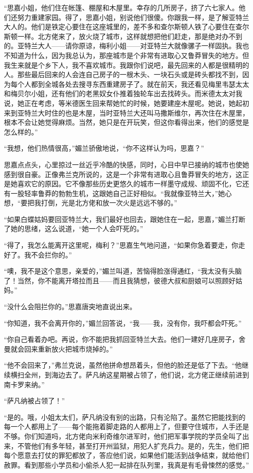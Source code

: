 \par “思嘉小姐，他们住在帐篷、棚屋和木屋里。幸存的几所房子，挤了六七家人。他们还努力重建家园。得了，思嘉小姐，别说他们很傻。你跟我一样，是了解亚特兰大人的。他们是铁定心要住在这座城里的，差不多和查尔斯顿人铁了心要住在查尔斯顿一样。北方佬来了，放火烧了城市，这样就想把他们赶走，那是绝对办不到的。亚特兰大人——请你原谅，梅利小姐——对亚特兰大就像骡子一样固执。我也不知道为什么，因为我总认为，那座城市是个非常有进取心又鲁莽冒失的地方。但我生来就是个乡下人，我不喜欢城市。我跟你们说吧，最先回来的人都是很精明的人。那些最后回来的人会连自己房子的一根木头、一块石头或是砖头都找不到，因为每个人都到全城各处去搜寻东西重建房子了。就在前天，我还看见梅里韦瑟太太和梅贝尔小姐，还有他们的老黑奴女仆推着独轮车出去找砖头。而米德太太对我说，她正在考虑，等米德医生回来帮她忙的时候，她要建座木屋呢。她说，她起初来到亚特兰大时住的也是木屋，当时亚特兰大还叫马撒斯维尔，再次住在木屋里，根本不会让她觉得麻烦。当然，她只是在开玩笑，但这你看得出来，他们的感觉是怎么样的。”
\par “我想，他们热情很高，”媚兰骄傲地说，“你不这样认为吗，思嘉？”
\par 思嘉点点头，心里掠过一丝近乎冷酷的快感，同时，心目中早已接纳的城市也使她感到很自豪。正像弗兰克所说的，这是一个非常有进取心且鲁莽冒失的地方，这正是她喜欢它的原因。它不像那些历史更悠久的城市一样墨守成规、顽固不化，它还有一股轻率鲁莽的勃勃生机，这跟她自己正好相似。“我就像亚特兰大，”她心想，“要把我打倒，光是北方佬和放一次火是远远不够的。”
\par “如果白蝶姑妈要回亚特兰大，我们最好也回去，跟她住在一起，思嘉，”媚兰打断了她的思绪，这么说道，“她一个人会吓死的。”
\par “得了，我怎么能离开这里呢，梅利？”思嘉生气地问道，“如果你急着要走，你走好了。我不会拦你的。”
\par “噢，我不是这个意思，亲爱的，”媚兰叫道，苦恼得脸涨得通红，“我太没有头脑了！当然，你不能离开塔拉而且——而且我猜想，彼德大叔和厨娘可以照顾好姑妈。”
\par “没什么会阻拦你的。”思嘉唐突地直说出来。
\par “你知道，我不会离开你的，”媚兰回答说，“我——我，没有你，我吓都会吓死。”
\par “你自己看着办吧。再说，你不能把我抓回亚特兰大去。他们一建好几座房子，舍曼就会回来重新放火把城市烧掉的。”
\par “他不会回来了，”弗兰克说，虽然他拼命想昂着头，但他的脸还是低了下去。“他继续横扫全州，到海边去了。萨凡纳这星期被占领了，他们说，北方佬正继续前进到南卡罗来纳。”
\par “萨凡纳被占领了！”
\par “是的。哦，小姐太太们，萨凡纳没有别的出路，只有沦陷了。虽然它把能找到的每一个人都用上了——每个能拖着脚走路的人都用上了，但要守住城市，人手还是不够。你们知道吗，北方佬向米利奇维尔进军时，他们把军事学院的学员全叫了出来，不管他们有多年轻，甚至打开州监狱，用犯人扩充兵力。是的，先生，他们把每个愿意去打仗的罪犯都放了，答应他们说，如果他们能活到战争结束，就给他们赦罪。看到那些小学员和小偷杀人犯一起排在队列里，我真是有毛骨悚然的感觉。”
